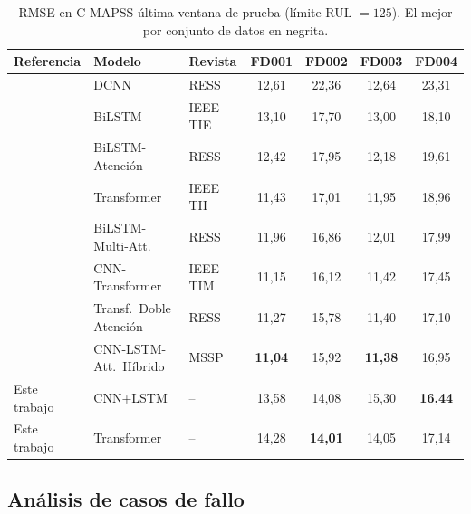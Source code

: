 \documentclass[5p,times,authoryear]{elsarticle}
\begin{document}
\begin{table}[!t]
\centering
\caption{RMSE en C-MAPSS última ventana de prueba (límite RUL $=125$). El mejor por conjunto de datos en negrita.}
\label{tab:sota}
\small
\begin{tabular}{lllcccc}
\toprule
Referencia & Modelo & Revista & FD001 & FD002 & FD003 & FD004 \\
\midrule
\citet{li2018remaining}    & DCNN                     & RESS    & 12,61 & 22,36 & 12,64 & 23,31 \\
\citet{zhang2019bilstm}    & BiLSTM                   & IEEE TIE & 13,10 & 17,70 & 13,00 & 18,10 \\
\citet{chen2020machine}    & BiLSTM-Atención          & RESS    & 12,42 & 17,95 & 12,18 & 19,61 \\
\citet{zhu2021transformer} & Transformer              & IEEE TII & 11,43 & 17,01 & 11,95 & 18,96 \\
\citet{mo2022remaining}    & BiLSTM-Multi-Att.        & RESS    & 11,96 & 16,86 & 12,01 & 17,99 \\
\citet{song2023cnntrf}     & CNN-Transformer          & IEEE TIM & 11,15 & 16,12 & 11,42 & 17,45 \\
\citet{liu2023dual}        & Transf.\ Doble Atención  & RESS    & 11,27 & 15,78 & 11,40 & 17,10 \\
\citet{wang2024hybrid}     & CNN-LSTM-Att.\ Híbrido   & MSSP    & \textbf{11,04} & 15,92 & \textbf{11,38} & 16,95 \\
\midrule
Este trabajo               & CNN+LSTM                 & --      & 13,58 & 14,08 & 15,30 & \textbf{16,44} \\
Este trabajo               & Transformer              & --      & 14,28 & \textbf{14,01} & 14,05 & 17,14 \\
\bottomrule
\end{tabular}
\end{table}

\subsection{Análisis de casos de fallo}\label{sec:results-failure}
\end{document}

